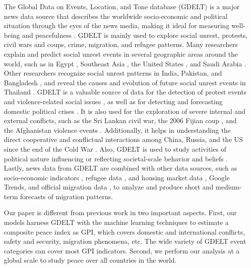 \documentclass{bmcart}
\begin{document}
The Global Data on Events, Location, and Tone database (GDELT) is a major news data source that describes the worldwide socio-economic and political situation through the eyes of the news media, making it ideal for measuring well-being and peacefulness \cite{gdelt_site}.
GDELT is mainly used to explore social unrest, protests, civil wars and coups, crime, migration, and refugee patterns. Many researchers explain and predict social unrest events in several geographic areas around the world, such as in Egypt \cite{wu2017forecasting}, Southeast Asia \cite{qiao2017predicting}, the United States \cite{galla2018predicting}, and Saudi Arabia \cite{alsaqabi2019using}. Other researchers recognize social unrest patterns in India, Pakistan, and Bangladesh \cite{joshi2017surge}, and reveal the causes and evolution of future social unrest events in Thailand \cite{fengcai2020online}. 
GDELT is a valuable source of data for the detection of protest events \cite{qiao2015graph} and violence-related social issues \cite{gonzalez2020application}, as well as for detecting and forecasting domestic political crises \cite{keneshloo2014detecting}. 
It is also used for the exploration of severe internal and external conflicts, such as the Sri Lankan civil war, the 2006 Fijian coup \cite{keertipati2014multi}, and the Afghanistan violence events \cite{yonamine2013predicting}. Additionally, it helps in understanding the direct cooperative and conflictual interactions among China, Russia, and the US since the end of the Cold War \cite{yuan2020cooperative}.
Also, GDELT is used to study activities of political nature influencing or reflecting societal-scale behavior and
beliefs \cite{boecking2015event}. 
Lastly, news data from GDELT are combined with other data sources, such as socio-economic indicators \cite{ahmed2016multi}, refugee data \cite{beine2019refugee}, and housing market data \cite{bertoli2019integration}, Google Trends, and official migration data \cite{carammia2020forecasting}, to analyze and produce short and medium-term forecasts of migration patterns.

Our paper is different from previous work in two important aspects. First, our models harness GDELT with the machine learning techniques to estimate a composite peace index as GPI, which covers domestic and international conflicts, safety and security, migration phenomena, etc. The wide variety of GDELT event categories can cover most GPI indicators. Second, we perform our analysis at a global scale to study peace over all countries in the world.
\end{document}
